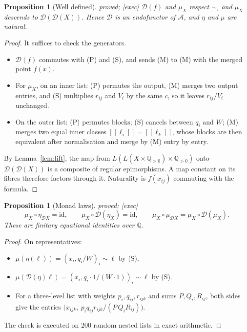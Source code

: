 \documentclass[11pt]{article}
\newtheorem{proposition}[theorem]{Proposition}
\theoremstyle{definition}
\theoremstyle{remark}
\newcommand{\st}[1]{\textsf{\small\color{gray}#1}}
\begin{document}
\begin{proposition}[Well defined]\label{prop:dwelldef}\st{proved; [exec]}
$\mathcal D(f)$ and $\mu_X$ respect $\sim$, and $\mu_X$ descends to $\mathcal D(\mathcal D(X))$. Hence $\mathcal D$ is an endofunctor of $\mathcal A$, and $\eta$ and $\mu$ are natural.
\end{proposition}
\begin{proof}
It suffices to check the generators.
\begin{itemize}
  \item $\mathcal D(f)$ commutes with (P) and (S), and sends (M) to (M) with the merged point $f(x)$.
  \item For $\mu_X$, on an inner list: (P) permutes the output, (M) merges two output entries, and (S) multiplies $r_{ij}$ and $V_i$ by the same $c$, so it leaves $r_{ij}/V_i$ unchanged.
  \item On the outer list: (P) permutes blocks; (S) cancels between $q_i$ and $W$; (M) merges two equal inner classes $[\![\ell_i]\!]=[\![\ell_k]\!]$, whose blocks are then equivalent after normalisation and merge by (M) entry by entry.
\end{itemize}
By Lemma~\ref{lem:lift}, the map from $L(L(X\times\mathbb Q_{>0})\times\mathbb Q_{>0})$ onto $\mathcal D(\mathcal D(X))$ is a composite of regular epimorphisms. A map constant on its fibres therefore factors through it. Naturality is $f(x_{ij})$ commuting with the formula.
\end{proof}

\begin{proposition}[Monad laws]\label{prop:dmonadlaws}\st{proved; [exec]}
\[ \mu_X\circ\eta_{\mathcal D X}=\mathrm{id},\qquad \mu_X\circ\mathcal D(\eta_X)=\mathrm{id},\qquad \mu_X\circ\mu_{\mathcal D X}=\mu_X\circ\mathcal D(\mu_X). \]
These are finitary equational identities over $\mathbb Q$.
\end{proposition}
\begin{proof}
On representatives:
\begin{itemize}
  \item $\mu(\eta(\ell))=(x_i,q_i/W)_i\sim\ell$ by (S).
  \item $\mu(\mathcal D(\eta)\ell)=(x_i,q_i\cdot1/(W\cdot1))_i\sim\ell$ by (S).
  \item For a three-level list with weights $p_i,q_{ij},r_{ijk}$ and sums $P,Q_i,R_{ij}$, both sides give the entries $\big(x_{ijk},\ p_iq_{ij}r_{ijk}/(P\,Q_iR_{ij})\big)$.
\end{itemize}
The check is executed on $200$ random nested lists in exact arithmetic.
\end{proof}
\end{document}
